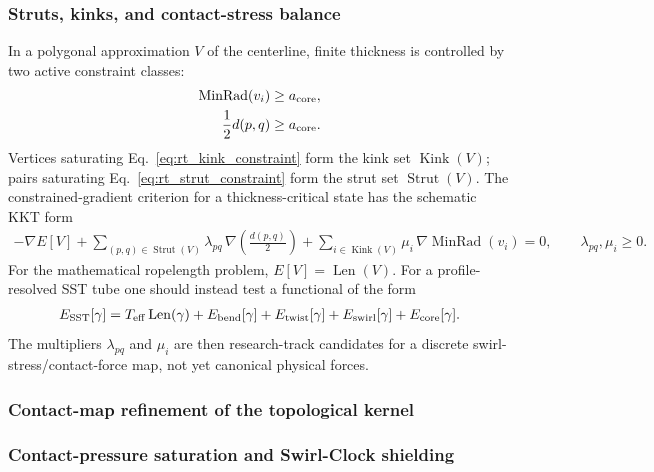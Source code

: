 \subsubsection{Struts, kinks, and contact-stress balance}
In a polygonal approximation $V$ of the centerline, finite thickness is
controlled by two active constraint classes:
\begin{align}
    \operatorname{MinRad}(v_i)&\ge a_{\rm core},
    \label{eq:rt_kink_constraint}\\
    \frac12 d(p,q)&\ge a_{\rm core}.
    \label{eq:rt_strut_constraint}
\end{align}
Vertices saturating Eq.~\eqref{eq:rt_kink_constraint} form the kink set
$\operatorname{Kink}(V)$; pairs saturating Eq.~\eqref{eq:rt_strut_constraint}
form the strut set $\operatorname{Strut}(V)$.  The constrained-gradient
criterion for a thickness-critical state has the schematic KKT form
\begin{align}
    -\nabla E[V]
    +
    \sum_{(p,q)\in\operatorname{Strut}(V)}
        \lambda_{pq}\,
        \nabla\!\left(\frac{d(p,q)}{2}\right)
    +
    \sum_{i\in\operatorname{Kink}(V)}
        \mu_i\,\nabla\operatorname{MinRad}(v_i)
    =0,
    \qquad
    \lambda_{pq},\mu_i\ge0 .
    \label{eq:rt_contact_kkt_balance}
\end{align}
For the mathematical ropelength problem, $E[V]=\operatorname{Len}(V)$.  For a
profile-resolved SST tube one should instead test a functional of the form
\begin{align}
    E_{\rm SST}[\gamma]
    =
    T_{\rm eff}\operatorname{Len}(\gamma)
    +E_{\rm bend}[\gamma]
    +E_{\rm twist}[\gamma]
    +E_{\rm swirl}[\gamma]
    +E_{\rm core}[\gamma] .
    \label{eq:rt_resolved_tube_energy}
\end{align}
The multipliers $\lambda_{pq}$ and $\mu_i$ are then research-track candidates
for a discrete swirl-stress/contact-force map, not yet canonical physical
forces.

\subsubsection{Contact-map refinement of the topological kernel}\subsubsection{Contact-pressure saturation and Swirl-Clock shielding}
\label{subsec:rt_contact_pressure_saturation_swirl_clock}


